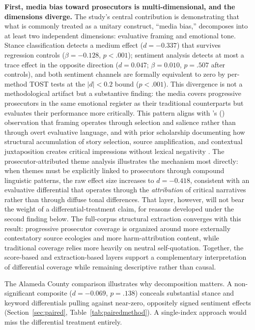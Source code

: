 \documentclass[12pt, letterpaper]{article}
\begin{document}
\textbf{First, media bias toward prosecutors is multi-dimensional, and the dimensions diverge.} The study's central contribution is demonstrating that what is commonly treated as a unitary construct, ``media bias,'' decomposes into at least two independent dimensions: evaluative framing and emotional tone. Stance classification detects a medium effect ($d = -0.337$) that survives regression controls ($\beta = -0.128$, $p < .001$); sentiment analysis detects at most a trace effect in the opposite direction ($d = 0.047$; $\beta = 0.010$, $p = .507$ after controls), and both sentiment channels are formally equivalent to zero by per-method TOST tests at the $|d| < 0.2$ bound ($p < .001$). This divergence is not a methodological artifact but a substantive finding: the media covers progressive prosecutors in the same emotional register as their traditional counterparts but evaluates their performance more critically. This pattern aligns with \citeauthor{entman1993}'s (\citeyear{entman1993}) observation that framing operates through selection and salience rather than through overt evaluative language, and with prior scholarship documenting how structural accumulation of story selection, source amplification, and contextual juxtaposition creates critical impressions without lexical negativity \citep{beale2006,surette2015}. The prosecutor-attributed theme analysis illustrates the mechanism most directly: when themes must be explicitly linked to prosecutors through compound linguistic patterns, the raw effect size increases to $d = -0.418$, consistent with an evaluative differential that operates through the \emph{attribution} of critical narratives rather than through diffuse tonal differences. That layer, however, will not bear the weight of a differential-treatment claim, for reasons developed under the second finding below. The full-corpus structural extraction converges with this result: progressive prosecutor coverage is organized around more externally contestatory source ecologies and more harm-attribution content, while traditional coverage relies more heavily on neutral self-quotation. Together, the score-based and extraction-based layers support a complementary interpretation of differential coverage while remaining descriptive rather than causal.

The Alameda County comparison illustrates why decomposition matters. A non-significant composite ($d = -0.069$, $p = .138$) conceals substantial stance and keyword differentials pulling against near-zero, oppositely signed sentiment effects (Section~\ref{sec:paired}, Table~\ref{tab:pairedmethod}). A single-index approach would miss the differential treatment entirely.
\end{document}
